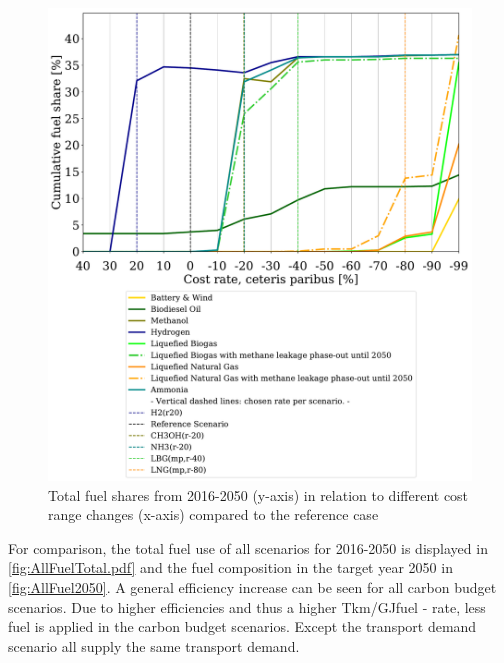 \documentclass[article]{elsarticle}
\begin{document}
\begin{figure}[htb]
    \centering
    \includegraphics[width=\textwidth]{figures/costVariation.pdf}
    \caption{Total fuel shares from 2016-2050 (y-axis) in relation to different cost range changes (x-axis) compared to the reference case}
    \label{fig:costVariation}
\end{figure}

For comparison, the total fuel use of all scenarios for 2016-2050 is displayed in \autoref{fig:AllFuelTotal.pdf} and the fuel composition in the target year 2050 in \autoref{fig:AllFuel2050}. A general efficiency increase can be seen for all carbon budget scenarios. Due to higher efficiencies and thus a higher Tkm/GJfuel - rate, less fuel is applied in the carbon budget scenarios. Except the transport demand scenario all supply the same transport demand.
\end{document}
